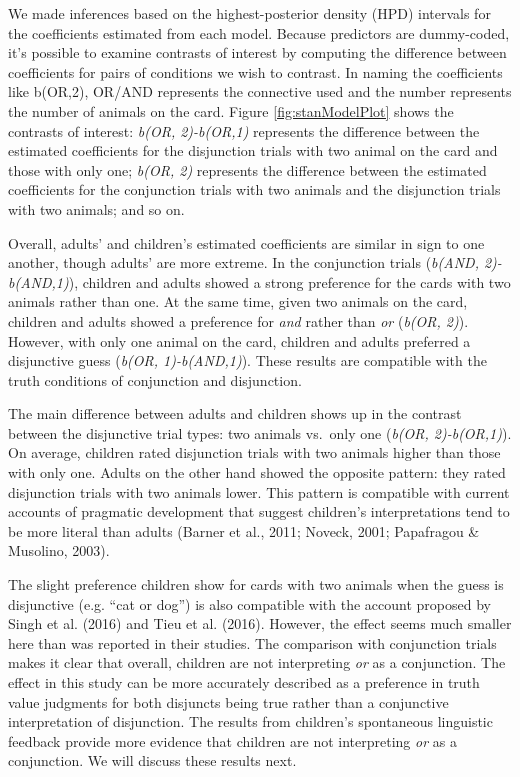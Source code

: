 \documentclass[floatsintext,man]{apa6}
\theoremstyle{definition}
\theoremstyle{definition}
\theoremstyle{definition}
\theoremstyle{remark}
\begin{document}
We made inferences based on the highest-posterior density (HPD)
intervals for the coefficients estimated from each model. Because
predictors are dummy-coded, it's possible to examine contrasts of
interest by computing the difference between coefficients for pairs of
conditions we wish to contrast. In naming the coefficients like b(OR,2),
OR/AND represents the connective used and the number represents the
number of animals on the card. Figure \ref{fig:stanModelPlot} shows the
contrasts of interest: \emph{b(OR, 2)-b(OR,1)} represents the difference
between the estimated coefficients for the disjunction trials with two
animal on the card and those with only one; \emph{b(OR, 2)} represents
the difference between the estimated coefficients for the conjunction
trials with two animals and the disjunction trials with two animals; and
so on.

Overall, adults' and children's estimated coefficients are similar in
sign to one another, though adults' are more extreme. In the conjunction
trials (\emph{b(AND, 2)-b(AND,1)}), children and adults showed a strong
preference for the cards with two animals rather than one. At the same
time, given two animals on the card, children and adults showed a
preference for \emph{and} rather than \emph{or} (\emph{b(OR, 2)}).
However, with only one animal on the card, children and adults preferred
a disjunctive guess (\emph{b(OR, 1)-b(AND,1)}). These results are
compatible with the truth conditions of conjunction and disjunction.

The main difference between adults and children shows up in the contrast
between the disjunctive trial types: two animals vs.~only one
(\emph{b(OR, 2)-b(OR,1)}). On average, children rated disjunction trials
with two animals higher than those with only one. Adults on the other
hand showed the opposite pattern: they rated disjunction trials with two
animals lower. This pattern is compatible with current accounts of
pragmatic development that suggest children's interpretations tend to be
more literal than adults (Barner et al., 2011; Noveck, 2001; Papafragou
\& Musolino, 2003).

The slight preference children show for cards with two animals when the
guess is disjunctive (e.g. \enquote{cat or dog}) is also compatible with
the account proposed by Singh et al. (2016) and Tieu et al. (2016).
However, the effect seems much smaller here than was reported in their
studies. The comparison with conjunction trials makes it clear that
overall, children are not interpreting \emph{or} as a conjunction. The
effect in this study can be more accurately described as a preference in
truth value judgments for both disjuncts being true rather than a
conjunctive interpretation of disjunction. The results from children's
spontaneous linguistic feedback provide more evidence that children are
not interpreting \emph{or} as a conjunction. We will discuss these
results next.
\end{document}

